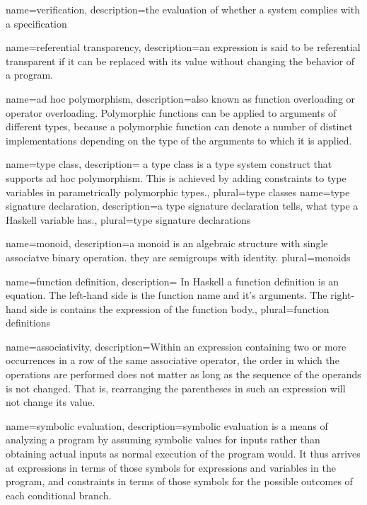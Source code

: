 {
name=verification,
description={the evaluation of whether a system complies with a specification}
}

{
name={referential transparency},
description={an expression is said to be referential transparent if it can be replaced with its value without changing the behavior of a program.}
}

{
name={ad hoc polymorphism},
description={also known as function overloading or operator overloading. Polymorphic functions can be applied to arguments of different types, because a polymorphic function can denote a number of distinct implementations depending on the type of the arguments to which it is applied.}
}

{
name={type class},
description={ a type class is a type system construct that supports ad hoc polymorphism. This is achieved by adding constraints to type variables in parametrically polymorphic types.},
plural={type classes}
}
{
name={type signature declaration},
description={a type signature declaration tells, what type a Haskell variable has.},
plural={type signature declarations}
}

{
name={monoid},
description={a monoid is an algebraic structure with single associatve binary operation. they are semigroups with identity.}
plural={monoids}
}

{
name={function definition},
description={ In Haskell a function definition is an equation. The left-hand side is the function name and it's arguments. The right-hand side is contains the expression of the function body.},
plural={function definitions}
}

{
name={associativity},
description={Within an expression containing two or more occurrences in a row of the same associative operator, the order in which the operations are performed does not matter as long as the sequence of the operands is not changed. That is, rearranging the parentheses in such an expression will not change its value.}
}

{
name={symbolic evaluation},
description={symbolic evaluation is a means of analyzing a program by assuming symbolic values for inputs rather than obtaining actual inputs as normal execution of the program would. It thus arrives at expressions in terms of those symbols for expressions and variables in the program, and constraints in terms of those symbols for the possible outcomes of each conditional branch.}
}

